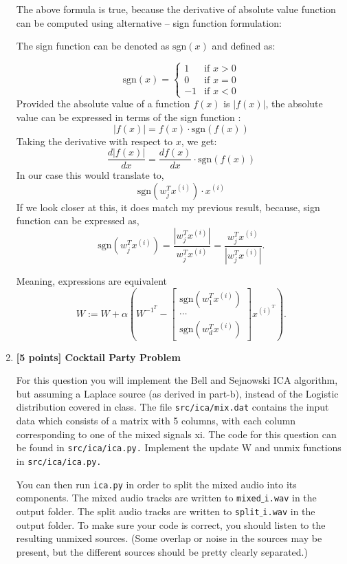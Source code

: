 \documentclass{article}
\begin{document}
\begin{enumerate}[label=(\alph*)]
The above formula is true,  because  the derivative of absolute value function can be computed using alternative -- sign function formulation:
\begin{tcolorbox}[colback=gray!20!white,colframe=gray!50!black]
The sign function can be denoted as 
\( \text{sgn}(x) \) and defined as:

\[
\text{sgn}(x) = 
\begin{cases} 
1 & \text{if } x > 0 \\
0 & \text{if } x = 0 \\
-1 & \text{if } x < 0 
\end{cases}
\]
Provided the absolute value of a function $ f(x) $ is $ |f(x)| $,  the absolute value can be expressed in terms of the sign function :
\[
|f(x)| = f(x) \cdot \text{sgn}(f(x)) 
\]
Taking the derivative with respect to \( x \), we get:
\[ \frac{d|f(x)|}{dx} = \frac{df(x)}{dx} \cdot \text{sgn}(f(x)) \]
In our case this would translate to,
\[
\text{sgn}(w^T_j x^{(i)}) \cdot x^{(i)}
\]
If we look closer at this, it does match my previous result, because, sign function can be expressed as,
\[
\text{sgn}(w^T_j x^{(i)}) = \frac{|w^T_j x^{(i)}|}{w^T_j x^{(i)}} = \frac{w^T_j x^{(i)}}{|w^T_j x^{(i)}|}. 
\]

\end{tcolorbox}
Meaning, expressions are equivalent
\[
W := W + \alpha\left(W^{-1^T} -\begin{bmatrix}
\text{sgn}(w^T_1 x^{(i)})\\[8pt]
\cdots\\
\text{sgn}(w^T_d x^{(i)})
\end{bmatrix}x^{(i)^T}\right).
\]


\item \textbf{[5 points] Cocktail Party Problem}

For this question you will implement the Bell and Sejnowski ICA algorithm, but assuming a Laplace source (as derived in part-b), instead of the Logistic distribution covered in class. The file \texttt{src/ica/mix.dat} contains the input data which consists of a matrix with 5 columns, with each column corresponding to one of the mixed signals xi. The code for this question can be found in \texttt{src/ica/ica.py.}
Implement the update W and unmix functions in \texttt{src/ica/ica.py.}

You can then run \texttt{ica.py} in order to split the mixed audio into its components. The mixed audio tracks are written to \texttt{mixed}$\_$\texttt{i.wav} in the output folder. The split audio tracks are written to \texttt{split}$\_$\texttt{i.wav} in the output folder.
To make sure your code is correct, you should listen to the resulting unmixed sources. (Some overlap or noise in the sources may be present, but the different sources should be pretty clearly separated.)


\end{enumerate}
\end{document}
